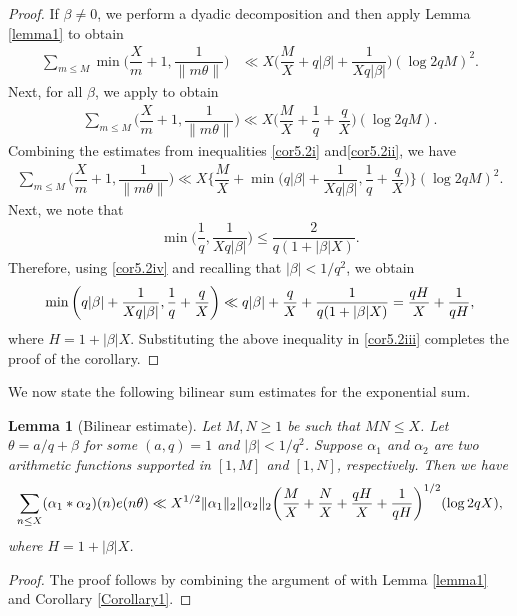 \documentclass[12pt]{amsart}
\numberwithin{equation}{section}
\newtheorem{lemma}[theorem]{Lemma}
\theoremstyle{remark}
\theoremstyle{definition}
\begin{document}
\begin{proof}
If $\beta\neq 0$, we perform a dyadic decomposition and then apply Lemma \ref{lemma1} to obtain
\begin{align}
\label{cor5.2i} \sum_{m\leq M}\min \bigg(\dfrac{X}{m}+1,\dfrac{1}{\|m\theta\|}\bigg)
 &\ll  X\bigg(\dfrac{M}{X} + q\lvert\beta\rvert + \dfrac{1}{Xq\lvert\beta\rvert}\bigg)(\log 2qM)^2.
\end{align}
Next, for all $\beta$, we apply \cite[Lemma 13.7]{iwakow} to obtain
\begin{align}
\label{cor5.2ii} \sum_{m\leq M}\bigg(\dfrac{X}{m} + 1, \dfrac{1}{\|m\theta\|}\bigg) \ll X\bigg(\dfrac{M}{X} + \dfrac{1}{q} + \dfrac{q}{X}\bigg)(\log 2qM).
\end{align}
Combining the estimates from inequalities \eqref{cor5.2i} and\eqref{cor5.2ii}, we have
\begin{align}\label{cor5.2iii}
\sum_{m\leq M}\bigg(\dfrac{X}{m} + 1, \dfrac{1}{\|m\theta\|}\bigg) \ll X\bigg\{\dfrac{M}{X} + \min\bigg(q|\beta| + \dfrac{1}{Xq|\beta|}, \dfrac{1}{q} + \dfrac{q}{X}\bigg)\bigg\}(\log 2qM)^2.
\end{align}
Next, we note that
\begin{align}\label{cor5.2iv}
\min\bigg(\dfrac{1}{q}, \dfrac{1}{Xq|\beta|}\bigg)\leq \dfrac{2}{q(1+|\beta|X)}.
\end{align}
Therefore, using \eqref{cor5.2iv} and recalling that $|\beta|<1/q^2$, we obtain
\begin{align}\notag 
\min\bigg(q|\beta| + \dfrac{1}{Xq|\beta|}, \dfrac{1}{q} + \dfrac{q}{X}\bigg)\ll q|\beta| + \dfrac{q}{X} + \dfrac{1}{q(1+|\beta|X)} = \dfrac{qH}{X} + \dfrac{1}{qH},
\end{align}
where $H=1+|\beta|X$. Substituting the above inequality in \eqref{cor5.2iii} completes the proof of the corollary.
\end{proof}


We now state the following bilinear sum estimates for the exponential sum.
\begin{lemma}[Bilinear estimate]\label{bilinear lemma}
Let $M, N \geq 1$ be such that $MN\leq X$. Let $\theta = a/q + \beta$ for some $(a, q)=1$ and $|\beta| < 1/q^2$. Suppose ${\alpha}_1$ and ${\alpha}_2$ are two arithmetic functions supported in $[1, M]$ and $[1, N]$, respectively. Then we have
\begin{align}\notag
\sum_{n\leq X}({\alpha}
_1*{\alpha}_2)(n)e(n \theta) \ll X^{1/2}\lVert {\alpha}_1 \rVert_2 \lVert {\alpha}_2 \rVert_2\bigg(\dfrac{M}{X} + \dfrac{N}{X} + \dfrac{qH}{X} + \dfrac{1}{qH} \bigg)^{1/2}(\log 2qX),
\end{align}
where $H=1+|\beta|X$.
\end{lemma}
\begin{proof}
The proof follows by combining the argument of \cite[Theorem 23.6]{kou} with Lemma \ref{lemma1} and Corollary \ref{Corollary1}.
\end{proof}
\end{document}
